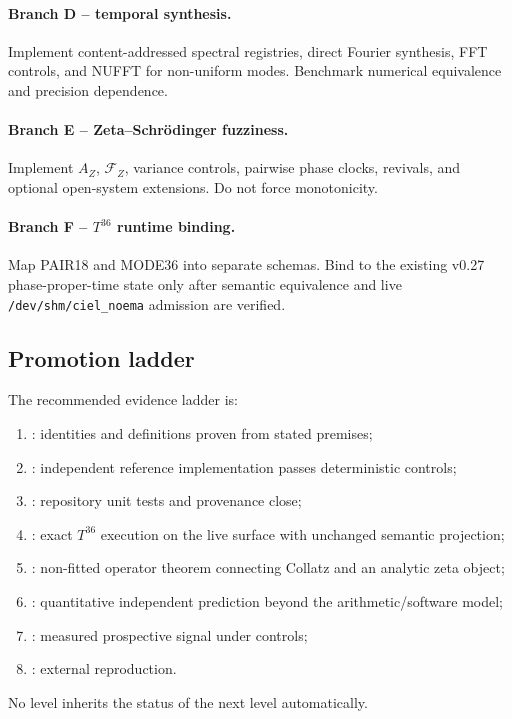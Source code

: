 \paragraph{Branch D -- temporal synthesis.}
Implement content-addressed spectral registries, direct Fourier synthesis, FFT controls, and NUFFT for non-uniform modes. Benchmark numerical equivalence and precision dependence.

\paragraph{Branch E -- Zeta--Schrödinger fuzziness.}
Implement \(A_Z\), \(\mathcal F_Z\), variance controls, pairwise phase clocks, revivals, and optional open-system extensions. Do not force monotonicity.

\paragraph{Branch F -- \(T^{36}\) runtime binding.}
Map PAIR18 and MODE36 into separate schemas. Bind to the existing v0.27 phase-proper-time state only after semantic equivalence and live \texttt{/dev/shm/ciel\_noema} admission are verified.

\subsection{Promotion ladder}

The recommended evidence ladder is:
\begin{enumerate}[leftmargin=2em]
\item {}: identities and definitions proven from stated premises;
\item {}: independent reference implementation passes deterministic controls;
\item {}: repository unit tests and provenance close;
\item {}: exact \(T^{36}\) execution on the live surface with unchanged semantic projection;
\item {}: non-fitted operator theorem connecting Collatz and an analytic zeta object;
\item {}: quantitative independent prediction beyond the arithmetic/software model;
\item {}: measured prospective signal under controls;
\item {}: external reproduction.
\end{enumerate}
No level inherits the status of the next level automatically.

